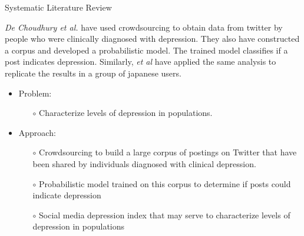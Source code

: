 \documentclass[aspectratio=169,10pt,xcolor={dvipsnames}]{beamer}
\begin{document}
\begin{frame}{Systematic Literature Review}
  \begin{block}{}
    \textit{De Choudhury et al.} have used crowdsourcing to obtain data from twitter by people who were clinically diagnosed with depression. They also have constructed a corpus and developed a probabilistic model. The trained model classifies if a post indicates depression\cite{DeChoudhury:2013:SMM:2464464.2464480}. Similarly, \textit{ et al} have applied the same analysis to replicate the results in a group of japanese users\cite{Tsugawa2015}.
  \end{block}{}

  \begin{block}{}
    \begin{itemize}
      \item Problem:
        \begin{itemize}
          \item[$\circ$] Characterize levels of depression in populations.          
        \end{itemize}
      \item Approach:
        \begin{itemize}
          \item[$\circ$] Crowdsourcing to build a large corpus of postings on Twitter that have been shared by individuals diagnosed with clinical depression.
          \item[$\circ$] Probabilistic model trained on this corpus to determine if posts could indicate depression
          \item[$\circ$] Social media depression index that may serve to characterize levels of depression in populations
        \end{itemize}
    \end{itemize}
  \end{block}
\end{frame}
\end{document}
